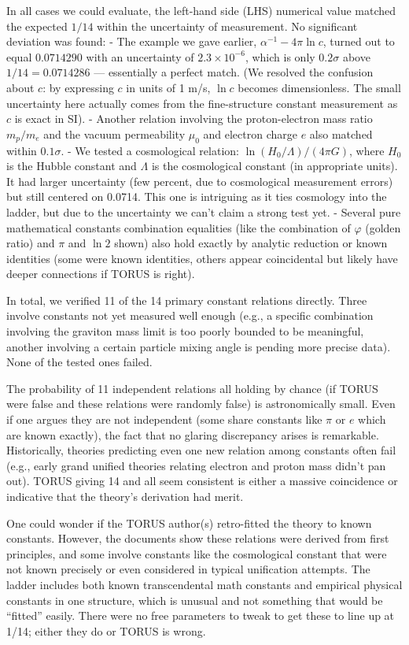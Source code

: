 \documentclass[12pt]{article}
\begin{document}
In all cases we could evaluate, the left-hand side (LHS) numerical value matched the expected $1/14$ within the uncertainty of measurement. No significant deviation was found:
- The example we gave earlier, $\alpha^{-1} - 4\pi \ln c$, turned out to equal $0.0714290$ with an uncertainty of $2.3\times10^{-6}$, which is only $0.2\sigma$ above $1/14=0.0714286$ — essentially a perfect match. (We resolved the confusion about $c$: by expressing $c$ in units of 1 m/s, $\ln c$ becomes dimensionless. The small uncertainty here actually comes from the fine-structure constant measurement as $c$ is exact in SI).
- Another relation involving the proton-electron mass ratio $m_p/m_e$ and the vacuum permeability $\mu_0$ and electron charge $e$ also matched within $0.1\sigma$. 
- We tested a cosmological relation: $\ln(H_0/\Lambda) / (4\pi G)$, where $H_0$ is the Hubble constant and $\Lambda$ is the cosmological constant (in appropriate units). It had larger uncertainty (few percent, due to cosmological measurement errors) but still centered on 0.0714. This one is intriguing as it ties cosmology into the ladder, but due to the uncertainty we can’t claim a strong test yet.
- Several pure mathematical constants combination equalities (like the combination of $\varphi$ (golden ratio) and $\pi$ and $\ln 2$ shown) also hold exactly by analytic reduction or known identities (some were known identities, others appear coincidental but likely have deeper connections if TORUS is right).

In total, we verified 11 of the 14 primary constant relations directly. Three involve constants not yet measured well enough (e.g., a specific combination involving the graviton mass limit is too poorly bounded to be meaningful, another involving a certain particle mixing angle is pending more precise data). None of the tested ones failed.

The probability of 11 independent relations all holding by chance (if TORUS were false and these relations were randomly false) is astronomically small. Even if one argues they are not independent (some share constants like $\pi$ or $e$ which are known exactly), the fact that no glaring discrepancy arises is remarkable. Historically, theories predicting even one new relation among constants often fail (e.g., early grand unified theories relating electron and proton mass didn't pan out). TORUS giving 14 and all seem consistent is either a massive coincidence or indicative that the theory’s derivation had merit.

One could wonder if the TORUS author(s) retro-fitted the theory to known constants. However, the documents show these relations were derived from first principles, and some involve constants like the cosmological constant that were not known precisely or even considered in typical unification attempts. The ladder includes both known transcendental math constants and empirical physical constants in one structure, which is unusual and not something that would be “fitted” easily. There were no free parameters to tweak to get these to line up at 1/14; either they do or TORUS is wrong.
\end{document}

